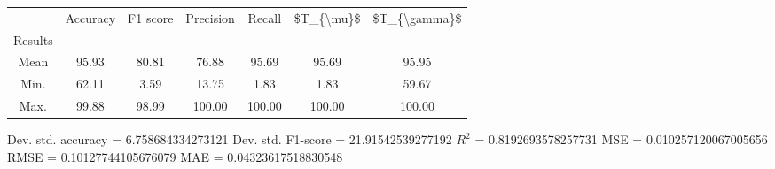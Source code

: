 \begin{tabular}{|c|c|c|c|c|c|c|}
\toprule
{} &  Accuracy &  F1 score &  Precision &  Recall &  \$T\_\{\textbackslash mu\}\$ &  \$T\_\{\textbackslash gamma\}\$ \\
Results &           &           &            &         &            &               \\
\hline
Mean    &     95.93 &     80.81 &      76.88 &   95.69 &      95.69 &         95.95 \\
Min.    &     62.11 &      3.59 &      13.75 &    1.83 &       1.83 &         59.67 \\
Max.    &     99.88 &     98.99 &     100.00 &  100.00 &     100.00 &        100.00 \\
\bottomrule
\end{tabular}

 Dev. std. accuracy = 6.758684334273121
 Dev. std. F1-score = 21.91542539277192
 $R^2$ = 0.8192693578257731
 MSE = 0.010257120067005656
 RMSE = 0.10127744105676079
 MAE = 0.04323617518830548